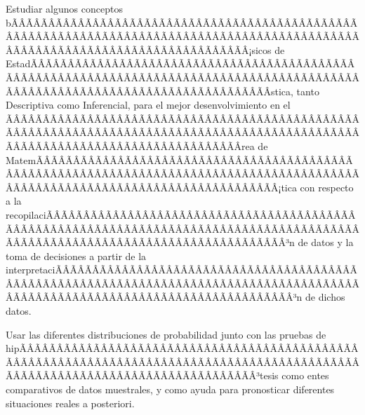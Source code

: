 \begin{sumilla}


\begin{objetivosdelcurso}
\item  Estudiar algunos conceptos bÃÂÃÂÃÂÃÂÃÂÃÂÃÂÃÂÃÂÃÂÃÂÃÂÃÂÃÂÃÂÃÂÃÂÃÂÃÂÃÂÃÂÃÂÃÂÃÂÃÂÃÂÃÂÃÂÃÂÃÂÃÂÃÂÃÂÃÂÃÂÃÂÃÂÃÂÃÂÃÂÃÂÃÂÃÂÃÂÃÂÃÂÃÂÃÂÃÂÃÂÃÂÃÂÃÂÃÂÃÂÃÂÃÂÃÂÃÂÃÂÃÂÃÂÃÂÃÂ¡sicos de EstadÃÂÃÂÃÂÃÂÃÂÃÂÃÂÃÂÃÂÃÂÃÂÃÂÃÂÃÂÃÂÃÂÃÂÃÂÃÂÃÂÃÂÃÂÃÂÃÂÃÂÃÂÃÂÃÂÃÂÃÂÃÂÃÂÃÂÃÂÃÂÃÂÃÂÃÂÃÂÃÂÃÂÃÂÃÂÃÂÃÂÃÂÃÂÃÂÃÂÃÂÃÂÃÂÃÂÃÂÃÂÃÂÃÂÃÂÃÂÃÂÃÂÃÂÃÂÃÂ­stica, tanto Descriptiva como Inferencial, para el mejor desenvolvimiento en el ÃÂÃÂÃÂÃÂÃÂÃÂÃÂÃÂÃÂÃÂÃÂÃÂÃÂÃÂÃÂÃÂÃÂÃÂÃÂÃÂÃÂÃÂÃÂÃÂÃÂÃÂÃÂÃÂÃÂÃÂÃÂÃÂÃÂÃÂÃÂÃÂÃÂÃÂÃÂÃÂÃÂÃÂÃÂÃÂÃÂÃÂÃÂÃÂÃÂÃÂÃÂÃÂÃÂÃÂÃÂÃÂÃÂÃÂÃÂÃÂÃÂÃÂÃÂÃÂrea de MatemÃÂÃÂÃÂÃÂÃÂÃÂÃÂÃÂÃÂÃÂÃÂÃÂÃÂÃÂÃÂÃÂÃÂÃÂÃÂÃÂÃÂÃÂÃÂÃÂÃÂÃÂÃÂÃÂÃÂÃÂÃÂÃÂÃÂÃÂÃÂÃÂÃÂÃÂÃÂÃÂÃÂÃÂÃÂÃÂÃÂÃÂÃÂÃÂÃÂÃÂÃÂÃÂÃÂÃÂÃÂÃÂÃÂÃÂÃÂÃÂÃÂÃÂÃÂÃÂ¡tica con respecto a la recopilaciÃÂÃÂÃÂÃÂÃÂÃÂÃÂÃÂÃÂÃÂÃÂÃÂÃÂÃÂÃÂÃÂÃÂÃÂÃÂÃÂÃÂÃÂÃÂÃÂÃÂÃÂÃÂÃÂÃÂÃÂÃÂÃÂÃÂÃÂÃÂÃÂÃÂÃÂÃÂÃÂÃÂÃÂÃÂÃÂÃÂÃÂÃÂÃÂÃÂÃÂÃÂÃÂÃÂÃÂÃÂÃÂÃÂÃÂÃÂÃÂÃÂÃÂÃÂÃÂ³n de datos y la toma de decisiones a partir de la interpretaciÃÂÃÂÃÂÃÂÃÂÃÂÃÂÃÂÃÂÃÂÃÂÃÂÃÂÃÂÃÂÃÂÃÂÃÂÃÂÃÂÃÂÃÂÃÂÃÂÃÂÃÂÃÂÃÂÃÂÃÂÃÂÃÂÃÂÃÂÃÂÃÂÃÂÃÂÃÂÃÂÃÂÃÂÃÂÃÂÃÂÃÂÃÂÃÂÃÂÃÂÃÂÃÂÃÂÃÂÃÂÃÂÃÂÃÂÃÂÃÂÃÂÃÂÃÂÃÂ³n de dichos datos.
\item  Usar las diferentes distribuciones de probabilidad junto con las pruebas de hipÃÂÃÂÃÂÃÂÃÂÃÂÃÂÃÂÃÂÃÂÃÂÃÂÃÂÃÂÃÂÃÂÃÂÃÂÃÂÃÂÃÂÃÂÃÂÃÂÃÂÃÂÃÂÃÂÃÂÃÂÃÂÃÂÃÂÃÂÃÂÃÂÃÂÃÂÃÂÃÂÃÂÃÂÃÂÃÂÃÂÃÂÃÂÃÂÃÂÃÂÃÂÃÂÃÂÃÂÃÂÃÂÃÂÃÂÃÂÃÂÃÂÃÂÃÂÃÂ³tesis como entes comparativos de datos muestrales, y como ayuda para pronosticar diferentes situaciones reales a posteriori.
\end{objetivosdelcurso}


\end{sumilla}
